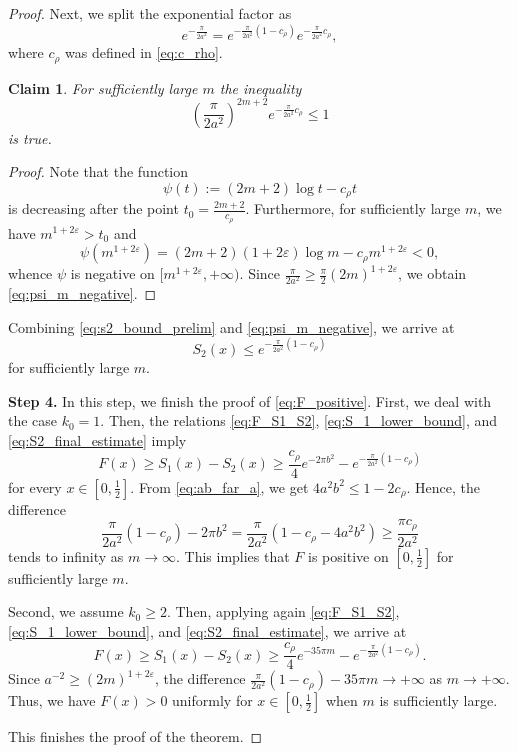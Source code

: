 \documentclass[11pt]{amsart}
\numberwithin{equation}{section}
\newtheorem{claim}[theorem]{Claim}
\begin{document}
\begin{proof}
Next, we split the exponential factor as 
$$e^{-\frac{\pi}{2a^2}}=e^{-\frac{\pi}{2a^2}(1-c_{\rho})}e^{-\frac{\pi}{2a^2}c_{\rho}},$$
where $c_{\rho}$ was defined in \eqref{eq:c_rho}.
\begin{claim}
    For sufficiently large $m$ the inequality
    \begin{equation}\label{eq:psi_m_negative}
    \left(\frac{\pi}{2a^2}\right)^{2m+2} e^{-\frac{\pi}{2a^2}c_{\rho}} \leq 1
\end{equation} is true.
\end{claim}
\begin{proof}
Note that the function $$\psi(t):=(2m+2)\log t- c_{\rho}t$$ is decreasing after the point $t_0=\frac{2m+2}{c_{\rho}}$. Furthermore, for sufficiently large $m$, we have $m^{1+2\varepsilon}>t_0$ and
$$
\psi(m^{1+2\varepsilon}) = (2m+2)(1+2\varepsilon) \log m - c_{\rho}m^{1+2\varepsilon} < 0, 
$$
whence $\psi$ is negative on $[m^{1+2\varepsilon},+\infty).$
Since $\frac{\pi}{2a^2} \geq \frac{\pi}{2}(2m)^{1+2\varepsilon}$, we obtain \eqref{eq:psi_m_negative}.   
\end{proof}

Combining \eqref{eq:s2_bound_prelim} and \eqref{eq:psi_m_negative}, we arrive at
\begin{equation}\label{eq:S2_final_estimate}
  S_2(x) \leq e^{-\frac{\pi}{2a^2}(1-c_{\rho})}  
\end{equation}
for sufficiently large $m$.

\textbf{Step 4.} In this step, we finish the proof of \eqref{eq:F_positive}. 
First, we deal with the case $k_0 = 1$. Then, the relations \eqref{eq:F_S1_S2}, \eqref{eq:S_1_lower_bound}, and \eqref{eq:S2_final_estimate} imply
$$
F(x) \geq S_1(x) - S_2(x) \geq \frac{c_{\rho}}{4}e^{-2\pi b^2}-e^{-\frac{\pi}{2a^2}(1-c_{\rho})}
$$
for every $x\in[0,\frac{1}{2}]$. From \eqref{eq:ab_far_a}, we get $4a^2b^2 \leq 1-2c_{\rho}.$
Hence, the difference  
$$
\frac{\pi}{2a^2}(1-c_\rho) - 2\pi b^2 = \frac{\pi}{2a^2}(1-c_\rho - 4 a^2 b^2) \geq  \frac{\pi c_{\rho}}{2a^2}
$$
tends to infinity as $m\to\infty$. This implies that $F$ is positive on $[0,\frac{1}{2}]$ for sufficiently large $m$.

Second, we assume $k_0\ge 2$. Then, applying again \eqref{eq:F_S1_S2}, \eqref{eq:S_1_lower_bound}, and \eqref{eq:S2_final_estimate}, we arrive at
$$
F(x) \geq S_1(x) - S_2(x) \geq \frac{c_{\rho}}{4}e^{-35\pi m}-e^{-\frac{\pi}{2a^2}(1-c_{\rho})}.
$$
Since $a^{-2}\geq (2m)^{1+2\varepsilon}$, the difference $\frac{\pi}{2a^2}(1-c_{\rho})-35\pi m \to +\infty$ as $m\to+\infty.$ Thus,  we have $F(x)> 0$ uniformly for $x\in[0,\frac{1}{2}]$ when $m$ is sufficiently large.

This finishes the proof of the theorem.
\end{proof}
\end{document}
